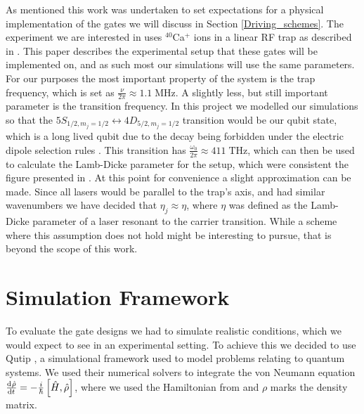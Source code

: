 \documentclass[12pt,twoside]{report}
\begin{document}
As mentioned this work was undertaken to set expectations for a physical implementation of the gates we will discuss in Section \ref{Driving_schemes}. The experiment we are interested in uses $^{40}$Ca$^+$ ions in a linear RF trap as described in \cite{Experiment_setup}. This paper describes the experimental setup that these gates will be implemented on, and as such most our simulations will use the same parameters. For our purposes the most important property of the system is the trap frequency, which is set as $\frac{\nu}{2\pi} \approx 1.1\;\text{MHz}$. A slightly less, but still important parameter is the transition frequency. In this project we modelled our simulations so that the $5S_{1/2,m_j=1/2} \leftrightarrow 4D_{5/2,m_j=1/2}$ transition would be our qubit state, which is a long lived qubit due to the decay being forbidden under the electric dipole selection rules \cite{Foot}. This transition has $\frac{\omega_0}{2\pi} \approx 411\;\text{THz}$, which can then be used to calculate the Lamb-Dicke parameter for the setup, which were consistent the figure presented in \cite{Experiment_setup}. At this point for convenience a slight approximation can be made. Since all lasers would be parallel to the trap's axis, and had similar wavenumbers we have decided that ${\eta_j \approx \eta}$, where $\eta$ was defined as the Lamb-Dicke parameter of a laser resonant to the carrier transition. While a scheme where this assumption does not hold might be interesting to pursue, that is beyond the scope of this work.

\chapter{Simulation Framework}
\label{Sim_Framework}

To evaluate the gate designs we had to simulate realistic conditions, which we would expect to see in an experimental setting. To achieve this we decided to use Qutip \cite{QuTip1,QuTip2}, a simulational framework used to model problems relating to quantum systems. We used their numerical solvers to integrate the von Neumann equation \cite{Shankar_QM} ${\frac{\text{d}^{}\hat{\rho}}{\text{d}t^{}} = -\frac{i}{\hbar}\left[\hat{H},\hat{\rho}\right]}$, where we used the Hamiltonian from  and $\rho$ marks the density matrix.
\end{document}
